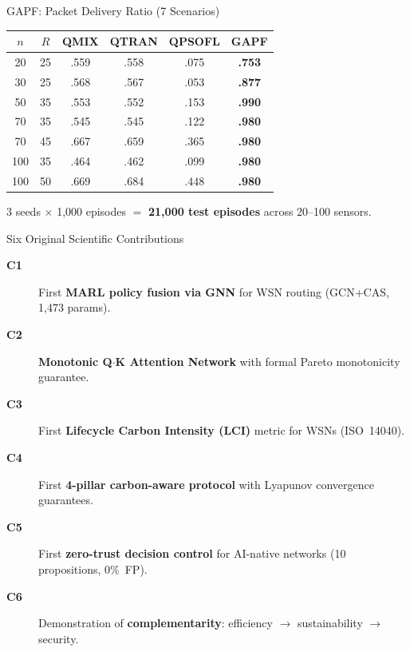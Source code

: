 \documentclass[final]{beamer}
\newlength{\colwidth}
\begin{document}
\begin{frame}[t]
\begin{columns}[t]
\begin{column}{\colwidth}
  \begin{block}{GAPF: Packet Delivery Ratio (7 Scenarios)}
    \footnotesize
    \begin{table}
      \centering
      \begin{tabular}{cc|cccc}
        \toprule
        $n$ & $R$ & QMIX & QTRAN & QPSOFL & \textbf{GAPF} \\
        \midrule
        20  & 25 & .559 & .558 & .075 & \textbf{.753} \\
        30  & 25 & .568 & .567 & .053 & \textbf{.877} \\
        50  & 35 & .553 & .552 & .153 & \textbf{.990} \\
        70  & 35 & .545 & .545 & .122 & \textbf{.980} \\
        70  & 45 & .667 & .659 & .365 & \textbf{.980} \\
        100 & 35 & .464 & .462 & .099 & \textbf{.980} \\
        100 & 50 & .669 & .684 & .448 & \textbf{.980} \\
        \bottomrule
      \end{tabular}
    \end{table}
    \normalsize
    3 seeds $\times$ 1,000 episodes $=$ \textbf{21,000 test episodes} across 20--100 sensors.
  \end{block}

  \begin{block}{Six Original Scientific Contributions}
    \begin{description}
      \item[\textbf{C1}] First \textbf{MARL policy fusion via GNN} for WSN routing (GCN+CAS, 1,473 params).
      \item[\textbf{C2}] \textbf{Monotonic Q$\cdot$K Attention Network} with formal Pareto monotonicity guarantee.
      \item[\textbf{C3}] First \textbf{Lifecycle Carbon Intensity (LCI)} metric for WSNs (ISO~14040).
      \item[\textbf{C4}] First \textbf{4-pillar carbon-aware protocol} with Lyapunov convergence guarantees.
      \item[\textbf{C5}] First \textbf{zero-trust decision control} for AI-native networks (10 propositions, 0\%~FP).
      \item[\textbf{C6}] Demonstration of \textbf{complementarity}: efficiency $\to$ sustainability $\to$ security.
    \end{description}
  \end{block}


\end{column}
\end{columns}
\end{frame}
\end{document}
